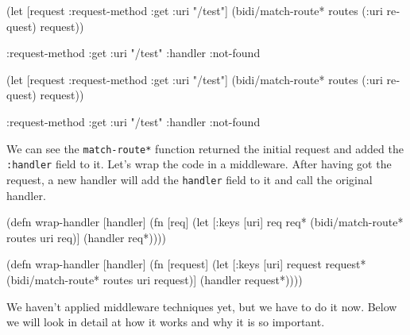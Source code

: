 \ifx\DEVICETYPE\MOBILE

\begin{english}
  \begin{clojure}
(let [request {:request-method :get
               :uri "/test"}]
  (bidi/match-route*
    routes (:uri request) request))

{:request-method :get
 :uri "/test"
 :handler :not-found}
  \end{clojure}
\end{english}

\else

\begin{english}
  \begin{clojure}
(let [request {:request-method :get
               :uri "/test"}]
  (bidi/match-route* routes (:uri request) request))

{:request-method :get
 :uri "/test"
 :handler :not-found}
  \end{clojure}
\end{english}

\fi

We can see the \verb|match-route*| function returned the initial request and added the \verb|:handler| field to it. Let's wrap the code in a middleware. After having got the request, a new handler will add the \verb|handler| field to it and call the original handler.

\ifx\DEVICETYPE\MOBILE

\begin{english}
  \begin{clojure}
(defn wrap-handler [handler]
  (fn [req]
    (let [{:keys [uri]} req
           req* (bidi/match-route*
                  routes uri req)]
      (handler req*))))
  \end{clojure}
\end{english}

\else

\begin{english}
  \begin{clojure}
(defn wrap-handler [handler]
  (fn [request]
    (let [{:keys [uri]} request
          request* (bidi/match-route* routes uri request)]
      (handler request*))))
  \end{clojure}
\end{english}

\fi

We haven't applied middleware techniques yet, but we have to do it now. Below we will look in detail at how it works and why it is so important.

